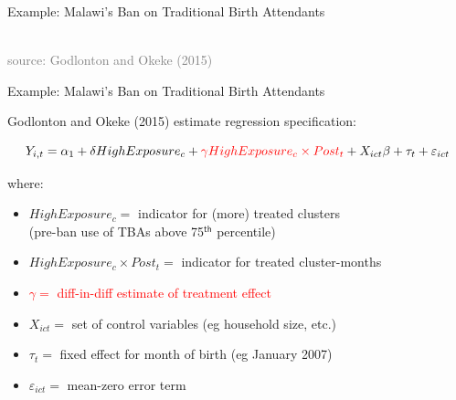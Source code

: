 \documentclass[10pt,xcolor=table,ignorenonframetext,aspectratio=169]{beamer}
\newlength{\wideitemsep}
\let\olditem\item
\renewcommand{\item}{\setlength{\itemsep}{\wideitemsep}\olditem}
\begin{document}
\begin{frame}{Example:  Malawi's Ban on Traditional Birth Attendants}

\medskip
\begin{center}
	 \\
	\textcolor{gray}{\tiny{source:  Godlonton and Okeke (2015)}}
\end{center}

\end{frame}




\begin{frame}{Example:  Malawi's Ban on Traditional Birth Attendants}

\medskip
Godlonton and Okeke (2015) estimate regression specification:
\begin{small}
	\begin{equation*}
	Y_{i,t} = \alpha_1 + \delta HighExposure_{c} + \textcolor{red}{\gamma HighExposure_{c} \times Post_t}  + X_{ict} \beta + \tau_t + \varepsilon_{ict}
	\end{equation*}
\end{small}

\vspace{-0.5cm}

where:

\medskip
\begin{itemize}
	
	\item $HighExposure_{c} = $ indicator for (more) treated clusters \\
	(pre-ban use of TBAs above 75$^{\textsf{th}}$ percentile)
	
	\item $HighExposure_{c} \times Post_t = $ indicator for treated cluster-months 
	
	\item \textcolor{red}{$\gamma = $ diff-in-diff estimate of treatment effect}
	
	\item $X_{ict} = $ set of control variables (eg household size, etc.)
	
	\item $\tau_t = $ fixed effect for month of birth (eg January 2007)
	
	\item $\varepsilon_{ict} = $ mean-zero error term
	
\end{itemize}


\end{frame}
\end{document}

